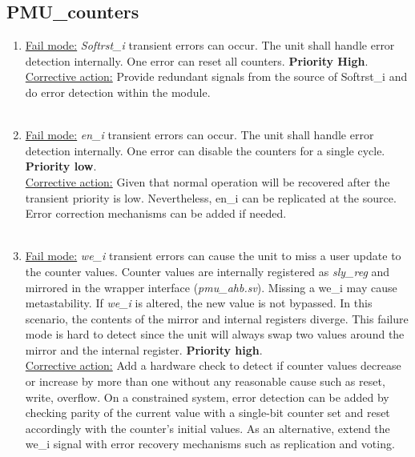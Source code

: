 \subsection{PMU\_counters}
\begin{enumerate}
\item \underline{Fail mode:} \textit{Softrst\_i} transient errors can occur. The unit shall handle error detection internally. One error can reset all counters. \textbf{Priority High}.\\
\underline{Corrective action:} Provide redundant signals from the source of Softrst\_i and do error detection within the module.\\
\\
\item \underline{Fail mode:} \textit{en\_i} transient errors can occur. The unit shall handle error detection internally. One error can disable the counters for a single cycle. \textbf{Priority low}.\\
\underline{Corrective action:} 
Given that normal operation will be recovered after the transient priority is low. Nevertheless, en\_i can be replicated at the source. Error correction mechanisms can be added if needed. \\
\\
\item \underline{Fail mode:} \textit{we\_i }transient errors can cause the unit to miss a user update to the counter values. Counter values are internally registered as \textit{sly\_reg} and mirrored in the wrapper interface (\textit{pmu\_ahb.sv}). Missing a we\_i may cause metastability. If \textit{we\_i} is altered, the new value is not bypassed. In this scenario, the contents of the mirror and internal registers diverge. This failure mode is hard to detect since the unit will always swap two values around the mirror and the internal register. \textbf{Priority high}.\\
\underline{Corrective action:}  Add a hardware check to detect if counter values decrease or increase by more than one without any reasonable cause such as reset, write, overflow. On a constrained system, error detection can be added by checking parity of the current value with a single-bit counter set and reset accordingly with the counter's initial values. As an alternative, extend the we\_i signal with error recovery mechanisms such as replication and voting.\\
\\
\end{enumerate}
